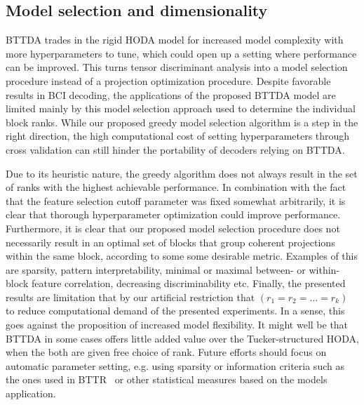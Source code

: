\subsection{Model selection and dimensionality}

BTTDA trades in the rigid HODA model for increased model complexity with more
hyperparameters to tune, which could open up a setting where performance can be
improved.
This turns tensor discriminant analysis into a model selection procedure
instead of a projection optimization procedure.
Despite favorable results in BCI decoding, the applications of the proposed
BTTDA model are limited mainly by this model selection approach used
to determine the individual block ranks.
While our proposed greedy model selection algorithm is a step in the right
direction, the high computational cost of setting hyperparameters through cross
validation can still hinder the portability of decoders relying on
BTTDA.

Due to its heuristic nature, the greedy algorithm does not always result in the
set of ranks with the highest achievable performance.
In combination with the fact that the feature selection cutoff parameter was
fixed somewhat arbitrarily, it is clear that thorough
hyperparameter optimization could improve performance.
Furthermore, it is clear that our proposed model selection procedure does not
necessarily result in an optimal set of blocks that group coherent projections
within the same block, according to some some desirable metric.
Examples of this are sparsity, pattern interpretability, minimal or maximal between- or within-block feature
correlation, decreasing discriminability etc.
Finally, the presented results are limitation that by our artificial restriction
that $(r_1=r_2=\ldots=r_k)$ to reduce computational demand of the presented
experiments.
In a sense, this goes against the proposition of increased model flexibility.
It might well be that BTTDA in some cases offers little added value over the
Tucker-structured HODA, when the both are given free choice of rank.
Future efforts should focus on automatic parameter setting, e.g. using sparsity
or information criteria such as the ones used in BTTR~\cite{Faes2022} or other
statistical measures based on the models application.

